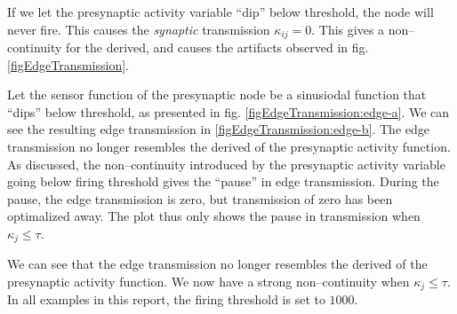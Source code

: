 			If we let the presynaptic activity variable ``dip'' below threshold, the node will never fire.
			This causes the \emph{synaptic} transmission $\kappa_{ij} = 0$.
			This gives a non--continuity for the derived, and causes the artifacts observed in fig. \ref{figEdgeTransmission}. 


			Let the sensor function of the presynaptic node be a sinusiodal function that ``dips'' below threshold, as presented in fig. \ref{figEdgeTransmission:edge-a}.
			We can see the resulting edge transmission in \ref{figEdgeTransmission:edge-b}.
			The edge transmission no longer resembles the derived of the presynaptic activity function.
			As discussed, the non--continuity introduced by the presynaptic activity variable going below firing threshold gives the ``pause'' in edge transmission.
			During the pause, the edge transmission is zero, but transmission of zero has been optimalized away.
			The plot thus only shows the pause in transmission when $\kappa_j \leq \tau$.


			We can see that the edge transmission no longer resembles the derived of the presynaptic activity function. 
			We now have a strong non--continuity when $\kappa_j \leq \tau$.
			In all examples in this report, the firing threshold is set to $1000$.







